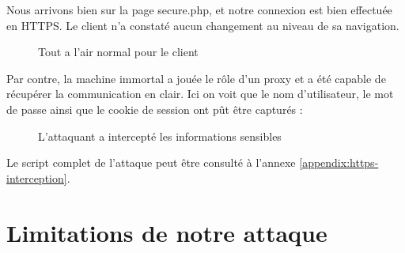 Nous arrivons bien sur la page secure.php, et notre connexion est bien effectuée en HTTPS. Le client n'a constaté aucun changement au niveau de sa navigation.

\begin{figure}[H]
  \caption{Tout a l'air normal pour le client}
\end{figure}

Par contre, la machine immortal a jouée le rôle d'un proxy et a été capable de récupérer la communication en clair. Ici on voit que le nom d'utilisateur, le mot de passe ainsi que le cookie de session ont pût être capturés :

\begin{figure}[H]
  \caption{L'attaquant a intercepté les informations sensibles}
\end{figure}

Le script complet de l'attaque peut être consulté à l'annexe \ref{appendix:https-interception}.

\section{Limitations de notre attaque}


